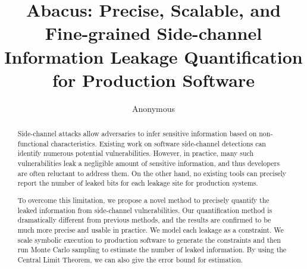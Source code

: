 \documentclass[conference]{IEEEtran}
\newcommand{\tool}{TANA}
\renewcommand{\tool}{CleverHans}
\renewcommand{\tool}{Cygne}
\renewcommand{\tool}{Do-Re-Mi}
\renewcommand{\tool}{Ta-fa Te-fe}
\renewcommand{\tool}{Ti-ri-ti-ri}
\renewcommand{\tool}{Du-Ta-De-Ta}
\renewcommand{\tool}{Abacus}
\begin{document}
\title{\tool{}: Precise, Scalable, and Fine-grained Side-channel Information Leakage Quantification for Production Software}
\author{Anonymous}

\maketitle

\begin{abstract}
    Side-channel attacks allow adversaries to infer sensitive information based
    on non-functional characteristics. Existing work on software side-channel
    detections can identify numerous potential vulnerabilities.
    However, in practice, many such vulnerabilities leak a negligible amount of
    sensitive information, and thus developers are often reluctant to address
    them.
    On the other hand, no existing tools can precisely report the number of
    leaked bits for each leakage site for production systems.

    To overcome this limitation, we propose a novel method to precisely quantify
    the leaked information from side-channel vulnerabilities. Our quantification
    method is dramatically different from previous methods, and the results are
    confirmed to be much more precise and usable in practice. We model each
    leakage as a constraint.
    We scale  symbolic execution to production software to generate the
    constraints
    and then run Monte Carlo sampling to estimate the number of leaked
    information.
    By using
    the Central Limit Theorem, we can also give the error bound for estimation.


\end{abstract}
\end{document}
